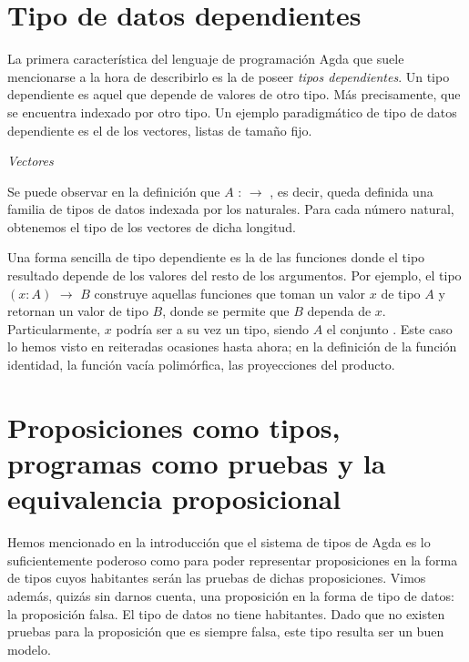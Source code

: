 \section{Tipo de datos dependientes}

La primera característica del lenguaje de programación Agda que suele mencionarse a la hora de describirlo es la de poseer {\it tipos dependientes}. Un tipo dependiente es aquel que depende de valores de otro tipo. Más precisamente, que se encuentra indexado por otro tipo. Un ejemplo paradigmático de tipo de datos dependiente es el de los vectores, listas de tamaño fijo. 
\begin{agdacode}{\it Vectores}\label{code:Vec}

\end{agdacode}

Se puede observar en la definición que  $A$ : \AgdaDatatype{$\Nat$} $\to$ , es decir, queda definida una familia de tipos de datos indexada por los naturales. Para cada número natural, obtenemos el tipo de los vectores de dicha longitud.

Una forma sencilla de tipo dependiente es la de las funciones donde el tipo resultado depende de los valores del resto de los argumentos. Por ejemplo, el tipo $(x : A)$ $\to$ $B$ construye aquellas funciones que toman un valor $x$ de tipo $A$ y retornan un valor de tipo $B$, donde se permite que $B$ dependa de $x$. Particularmente, $x$ podría ser a su vez un tipo, siendo $A$ el conjunto . Este caso lo hemos visto en reiteradas ocasiones hasta ahora; en la definición de la función identidad, la función vacía polimórfica, las proyecciones del producto.

\section[Proposiciones como tipos y la equivalencia proposicional]{Proposiciones como tipos, programas como pruebas y la equivalencia proposicional}\label{prop}

Hemos mencionado en la introducción que el sistema de tipos de Agda es lo suficientemente poderoso como para poder representar proposiciones en la forma de tipos cuyos habitantes serán las pruebas de dichas proposiciones. Vimos además, quizás sin darnos cuenta, una proposición en la forma de tipo de datos: la proposición falsa. El tipo de datos \AgdaDatatype{$\bot$} no tiene habitantes. Dado que no existen pruebas para la proposición que es siempre falsa, este tipo resulta ser un buen modelo.

